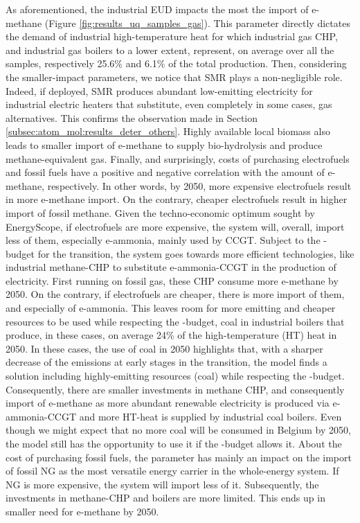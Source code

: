 As aforementioned, the industrial \gls{EUD} impacts the most the import of e-methane (Figure \ref{fig:results_uq_samples_gas}). This parameter directly dictates the demand of industrial high-temperature heat for which industrial gas \gls{CHP}, and industrial gas boilers to a lower extent, represent, on average over all the samples, respectively 25.6\% and 6.1\% of the total production. Then, considering the smaller-impact parameters, we notice that \gls{SMR} plays a non-negligible role. Indeed, if deployed, \gls{SMR} produces abundant low-emitting electricity for industrial electric heaters that substitute, even completely in some cases, gas alternatives. This confirms the observation made in Section \ref{subsec:atom_mol:results_deter_others}. Highly available local biomass also leads to smaller import of e-methane to supply bio-hydrolysis and produce methane-equivalent gas. Finally, and surprisingly, costs of purchasing electrofuels and fossil fuels have a positive and negative correlation with the amount of e-methane, respectively. In other words, by 2050, more expensive electrofuels result in more e-methane import. On the contrary, cheaper electrofuels result in higher import of fossil methane. Given the techno-economic optimum sought by EnergyScope, if electrofuels are more expensive, the system will, overall, import less of them, especially e-ammonia, mainly used by \gls{CCGT}. Subject to the -budget for the transition, the system goes towards more efficient technologies, like industrial methane-\gls{CHP} to substitute e-ammonia-\gls{CCGT} in the production of electricity. First running on fossil gas, these \gls{CHP} consume more e-methane by 2050. On the contrary, if electrofuels are cheaper, there is more import of them, and especially of e-ammonia. This leaves room for more emitting and cheaper resources to be used while respecting the -budget, \ie coal in industrial boilers that produce, in these cases, on average 24\% of the high-temperature (HT) heat in 2050. In these cases, the use of coal in 2050 highlights that, with a sharper decrease of the emissions at early stages in the transition, the model finds a solution including highly-emitting resources (\eg coal) while respecting the -budget. Consequently, there are smaller investments in methane \gls{CHP}, and consequently import of e-methane as more abundant renewable electricity is produced via e-ammonia-\gls{CCGT} and more HT-heat is supplied by industrial coal boilers. Even though we might expect that no more coal will be consumed in Belgium by 2050, the model still has the opportunity to use it if the -budget allows it. About the cost of purchasing fossil fuels, the parameter has mainly an impact on the import of fossil \gls{NG} as the most versatile energy carrier in the whole-energy system. If \gls{NG} is more expensive, the system will import less of it. Subsequently, the investments in methane-\gls{CHP} and boilers are more limited. This ends up in smaller need for e-methane by 2050.

